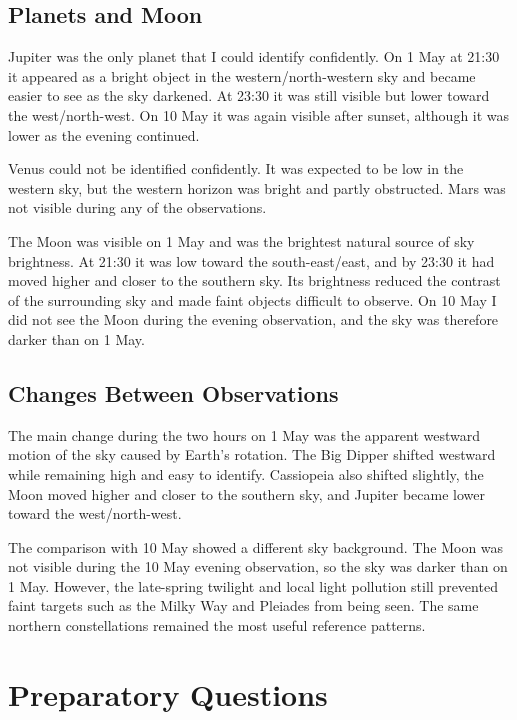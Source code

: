 \documentclass[a4paper,11pt]{article}
\begin{document}
\subsection{Planets and Moon}
Jupiter was the only planet that I could identify confidently. On 1 May at 21:30 it appeared as a bright object in the western/north-western sky and became easier to see as the sky darkened. At 23:30 it was still visible but lower toward the west/north-west. On 10 May it was again visible after sunset, although it was lower as the evening continued.

Venus could not be identified confidently. It was expected to be low in the western sky, but the western horizon was bright and partly obstructed. Mars was not visible during any of the observations.

The Moon was visible on 1 May and was the brightest natural source of sky brightness. At 21:30 it was low toward the south-east/east, and by 23:30 it had moved higher and closer to the southern sky. Its brightness reduced the contrast of the surrounding sky and made faint objects difficult to observe. On 10 May I did not see the Moon during the evening observation, and the sky was therefore darker than on 1 May.

\subsection{Changes Between Observations}
The main change during the two hours on 1 May was the apparent westward motion of the sky caused by Earth's rotation. The Big Dipper shifted westward while remaining high and easy to identify. Cassiopeia also shifted slightly, the Moon moved higher and closer to the southern sky, and Jupiter became lower toward the west/north-west.

The comparison with 10 May showed a different sky background. The Moon was not visible during the 10 May evening observation, so the sky was darker than on 1 May. However, the late-spring twilight and local light pollution still prevented faint targets such as the Milky Way and Pleiades from being seen. The same northern constellations remained the most useful reference patterns.

\section{Preparatory Questions}
\label{sec:questions}
\end{document}
